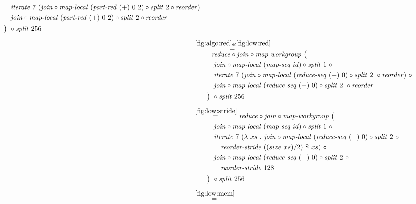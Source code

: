 \begin{align*}
\begin{aligned}
    &\qquad\quad\iterateN\ 7\ (\join \circ \mapLocal\ (\partRed\ (+)\ 0\ 2) \circ \splitN\ 2\circ \reorder)\\
    &\qquad\quad\join \circ \mapLocal\ (\partRed\ (+)\ 0\ 2) \circ \splitN\ 2\circ \reorder\\
    &\qquad\big)\ \circ \splitN\ 256
  \end{aligned}\\[.5em]
%
  &\hspace{-2em}\quad\begin{aligned}
    &\overset{\ref{fig:algo:red}\&\ref{fig:low:red}}{=\hspace{.2em}}\\[-.75em]
    &\qquad\ \ 
      \reduce \circ \join \circ \mapWorkgroup\ \big(\\
    &\qquad\quad\join \circ \mapLocal\ (\mapSeq\ id) \circ \splitN\ 1\ \circ\\
    &\qquad\quad\iterateN\ 7\ (\join \circ \mapLocal\ (\reduceSeq\ (+)\ 0) \circ \splitN\ 2\ \circ \reorder)\ \circ\\
    &\qquad\quad\join \circ \mapLocal\ (\reduceSeq\ (+)\ 0) \circ \splitN\ 2\ \circ \reorder\\
    &\qquad\big)\ \circ \splitN\ 256
  \end{aligned}\\[.5em]
%
  &\hspace{-2em}\quad\begin{aligned}
    &\overset{\ref{fig:low:stride}}{=\hspace{.2em}}
      \reduce \circ \join \circ \mapWorkgroup\ \big(\\
    &\qquad\quad\join \circ \mapLocal\ (\mapSeq\ id) \circ \splitN\ 1\ \circ\\
    &\qquad\quad\iterateN\ 7\ (\lambda\ xs\ .\ \join \circ \mapLocal\ (\reduceSeq\ (+)\ 0) \circ \splitN\ 2\ \circ\\
    &\qquad\qquad \reorderStride\ ((size\ xs)/2)\ \$\ xs )\ \circ\\
    &\qquad\quad\join \circ \mapLocal\ (\reduceSeq\ (+)\ 0) \circ \splitN\ 2\ \circ\\
    &\qquad\qquad\reorderStride\ 128\\
    &\qquad\big)\ \circ \splitN\ 256
  \end{aligned}\\[.5em]
%
  &\hspace{-2em}\quad\begin{aligned}
    &\overset{\ref{fig:low:mem}}{=\hspace{.2em}}

\end{aligned}
\end{align*}
